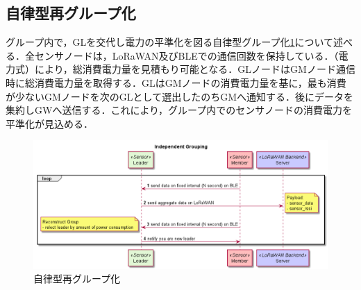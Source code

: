 \subsection{自律型再グループ化}
グループ内で，GLを交代し電力の平準化を図る自律型グループ化\ref{fig:group_reconstruction_independently}について述べる．全センサノードは，LoRaWAN及びBLEでの通信回数を保持している．（電力式）により，総消費電力量を見積もり可能となる．GLノードはGMノード通信時に総消費電力量を取得する．GLはGMノードの消費電力量を基に，最も消費が少ないGMノードを次のGLとして選出したのちGMへ通知する．後にデータを集約しGWへ送信する．これにより，グループ内でのセンサノードの消費電力を平準化が見込める．

\begin{figure}[]
    \begin{center}
    \includegraphics[width=14cm]{figures/グループ化_自律的.png}
    \caption{自律型再グループ化}
    \label{fig:group_reconstruction_independently}
    \end{center}
\end{figure}